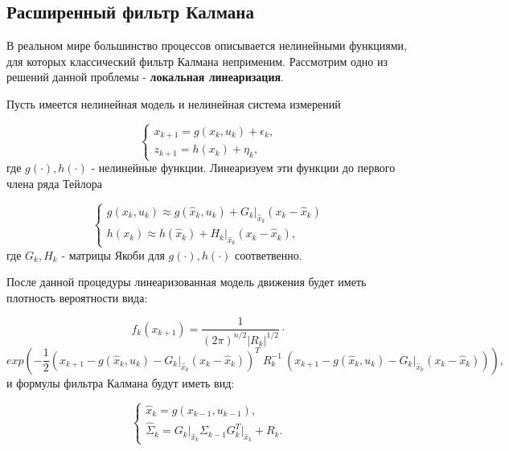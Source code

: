 \documentclass[12pt, a4paper]{article}
\begin{document}
\subsection*{Расширенный фильтр Калмана}

В реальном мире большинство процессов описывается нелинейными функциями, для которых классический фильтр Калмана неприменим. Рассмотрим одно из решений данной проблемы - \textbf{локальная линеаризация}.

Пусть имеется нелинейная модель и нелинейная система измерений

\begin{equation}
\begin{cases}
x_{k+1} = g(x_k, u_k) + \epsilon_k, \\
z_{k+1} = h(x_k) + \eta_k,
\end{cases}
\end{equation} 
где $g(\cdot), h(\cdot)$ - нелинейные функции. Линеаризуем эти функции до первого члена ряда Тейлора

\begin{equation}
\begin{cases}
g(x_k, u_k) \approx g(\widehat{x}_k, u_k) + G_k \big|_{\widehat{x}_k} (x_k - \widehat{x}_k)\\
h(x_k) \approx h(\widehat{x}_k) + H_k \big|_{\widehat{x}_k}(x_k - \widehat{x}_k),
\end{cases}
\end{equation} 
где $G_k, H_k$ - матрицы Якоби для $g(\cdot), h(\cdot)$ соответвенно.

После данной процедуры линеаризованная модель движения будет иметь плотность вероятности вида:

\begin{equation}
f_k(x_{k+1}) = \frac{1}{(2\pi)^{n/2} \vert R_k \vert^{1/2}} \cdot
\end{equation} 
\[exp\left(-\frac{1}{2}(x_{k+1} -g(\widehat{x}_k, u_k) - G_k \big|_{\widehat{x}_k} (x_k - \widehat{x}_k))^T \: R_k^{-1} \:(x_{k+1} -g(\widehat{x}_k, u_k) - G_k \big|_{\widehat{x}_k} (x_k - \widehat{x}_k))\right), \]
и формулы фильтра Калмана будут иметь вид:

\begin{equation}
\begin{cases}
\widehat{x}_{k} = g(x_{k-1}, u_{k-1}), \\
\widehat{\Sigma}_k = G_k\big|_{\widehat{x}_k}\Sigma_{k-1}G_k^T\big|_{\widehat{x}_k} + R_k.
\end{cases}
\end{equation}
\end{document}
